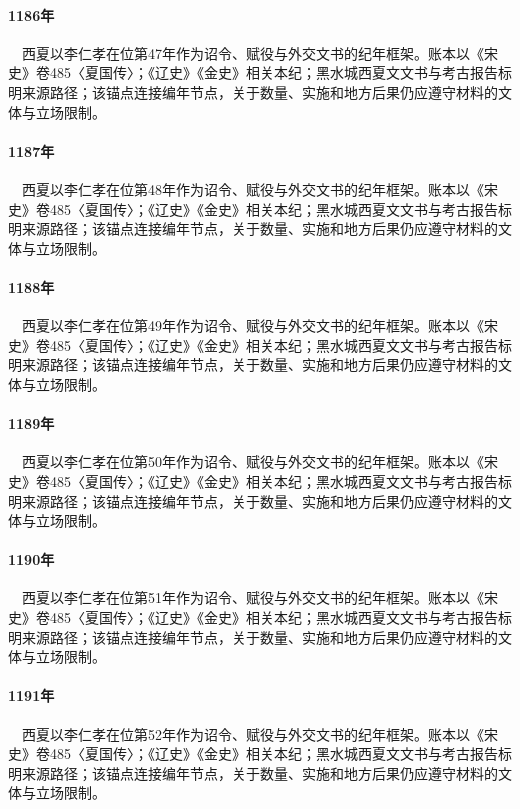 \paragraph{1186年}　西夏以李仁孝在位第47年作为诏令、赋役与外交文书的纪年框架。账本以《宋史》卷485〈夏国传〉；《辽史》《金史》相关本纪；黑水城西夏文文书与考古报告标明来源路径；该锚点连接编年节点，关于数量、实施和地方后果仍应遵守材料的文体与立场限制。

\paragraph{1187年}　西夏以李仁孝在位第48年作为诏令、赋役与外交文书的纪年框架。账本以《宋史》卷485〈夏国传〉；《辽史》《金史》相关本纪；黑水城西夏文文书与考古报告标明来源路径；该锚点连接编年节点，关于数量、实施和地方后果仍应遵守材料的文体与立场限制。

\paragraph{1188年}　西夏以李仁孝在位第49年作为诏令、赋役与外交文书的纪年框架。账本以《宋史》卷485〈夏国传〉；《辽史》《金史》相关本纪；黑水城西夏文文书与考古报告标明来源路径；该锚点连接编年节点，关于数量、实施和地方后果仍应遵守材料的文体与立场限制。

\paragraph{1189年}　西夏以李仁孝在位第50年作为诏令、赋役与外交文书的纪年框架。账本以《宋史》卷485〈夏国传〉；《辽史》《金史》相关本纪；黑水城西夏文文书与考古报告标明来源路径；该锚点连接编年节点，关于数量、实施和地方后果仍应遵守材料的文体与立场限制。

\paragraph{1190年}　西夏以李仁孝在位第51年作为诏令、赋役与外交文书的纪年框架。账本以《宋史》卷485〈夏国传〉；《辽史》《金史》相关本纪；黑水城西夏文文书与考古报告标明来源路径；该锚点连接编年节点，关于数量、实施和地方后果仍应遵守材料的文体与立场限制。

\paragraph{1191年}　西夏以李仁孝在位第52年作为诏令、赋役与外交文书的纪年框架。账本以《宋史》卷485〈夏国传〉；《辽史》《金史》相关本纪；黑水城西夏文文书与考古报告标明来源路径；该锚点连接编年节点，关于数量、实施和地方后果仍应遵守材料的文体与立场限制。

